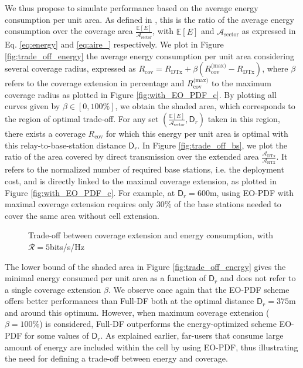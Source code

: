 \documentclass[journal]{IEEEtran}
\theoremstyle{definition}
\begin{document}
We thus propose to simulate performance based on the average energy consumption per unit area. As defined in \cite{correia2010}, this is the ratio of the average energy consumption over the coverage area $\frac{\mathbb{E}\left[E\right]}{\mathcal{A}_{\text{sector}}}$, with $\mathbb{E}\left[E\right]$ and $\mathcal{A}_{\text{sector}}$ as expressed in Eq. \eqref{eq:energy} and \eqref{eq:aire_} respectively.
We plot in Figure \ref{fig:trade_off_energy} the average energy consumption per unit area considering several coverage radius, expressed as
$R_{\text{cov}} = R_{\text{DTx}} + \beta \left( R_{\text{cov}}^{\text{(max)}}- R_{\text{DTx}} \right)$,
where $\beta$ refers to the coverage extension in percentage and $R_{\text{cov}}^{\text{(max)}}$ to the maximum coverage radius as plotted in Figure \ref{fig:with_EO_PDF_c}.
By plotting all curves given by $\beta \in \left[ 0,100\% \right]$, we obtain the shaded area, which corresponds to the region of optimal trade-off. For any set $(\frac{\mathbb{E}\left[E\right]}{\mathcal{A}_{\text{sector}}},\mathsf{D}_r)$ taken in this region, there exists a coverage $R_{\text{cov}}$ for which this energy per unit area is optimal with this relay-to-base-station distance $\mathsf{D}_r$.
In Figure \ref{fig:trade_off_bs}, we plot the ratio of the area covered by direct transmission over the extended area $\frac{\mathcal{A}_{\text{DTx}}}{\mathcal{A}_{\text{RTx}}}$. It refers to the normalized number of required base stations, i.e. the deployment cost, and is directly linked to the maximal coverage extension, as plotted in Figure \ref{fig:with_EO_PDF_c}. For example, at $\mathsf{D}_r=$600m, using EO-PDF with maximal coverage extension requires only 30\% of the base stations needed to cover the same area without cell extension.



\begin{figure}
	{\centering 
	\caption{Trade-off between coverage extension and energy consumption, with $\mathcal{R}= 5$bits/s/Hz}  
	\label{fig:trade_off}
	}
\end{figure}

The lower bound of the shaded area in Figure \ref{fig:trade_off_energy} gives the minimal energy consumed per unit area as a function of $\mathsf{D}_r$ and does not refer to a single coverage extension $\beta$.
We observe once again that the EO-PDF scheme offers better performances than Full-DF both at the optimal distance $\mathsf{D}_r=375$m and around this optimum. However, when maximum coverage extension ($\beta=100\%$) is considered, Full-DF outperforms the energy-optimized scheme EO-PDF for some values of $\mathsf{D}_r$. As explained earlier, far-users that consume large amount of energy are included within the cell by using EO-PDF, thus illustrating the need for defining a trade-off between energy and coverage.
\end{document}
